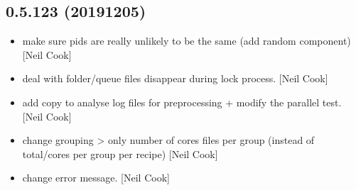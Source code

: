 \documentclass[a4paper,10pt,english]{report}
\begin{document}
\subsection{0.5.123 (2019\sphinxhyphen{}12\sphinxhyphen{}05)}
\label{\detokenize{misc/changelog:id38}}\begin{itemize}
\item {} 
 \sphinxhyphen{} make sure pids are really unlikely to be the
same (add random component) {[}Neil Cook{]}

\item {} 
 \sphinxhyphen{} deal with folder/queue files disappear during lock
process. {[}Neil Cook{]}

\item {} 
 \sphinxhyphen{} add copy to analyse log files for preprocessing +
modify the parallel test. {[}Neil Cook{]}

\item {} 
 \sphinxhyphen{} change grouping \textendash{}\textgreater{} only number
of cores files per group (instead of total/cores per group  per
recipe) {[}Neil Cook{]}

\item {} 
 \sphinxhyphen{} change error message. {[}Neil
Cook{]}

\end{itemize}
\end{document}
